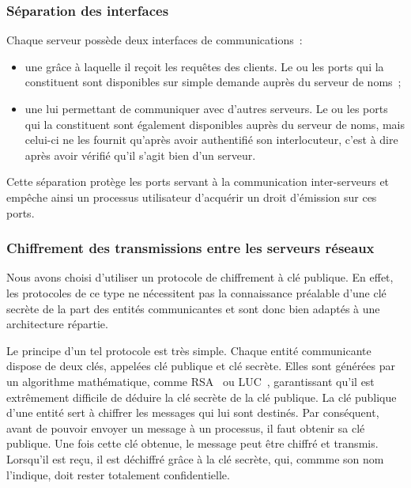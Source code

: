 \subsubsection{S\'eparation des interfaces}

Chaque serveur poss\`ede deux interfaces de communications~:
\begin{itemize}
\item une gr\^ace \`a laquelle il re\c{c}oit les requ\^etes des clients. Le ou les ports qui la constituent sont disponibles sur simple demande aupr\`es du serveur de noms~;
\item une lui permettant de communiquer avec d'autres serveurs.  Le ou les ports qui la constituent sont \'egalement disponibles aupr\`es du serveur de noms, mais celui-ci ne les fournit qu'apr\`es avoir authentifi\'e son interlocuteur, c'est \`a dire apr\`es avoir v\'erifi\'e qu'il s'agit bien d'un serveur.
\end{itemize}

Cette s\'eparation prot\`ege les ports servant \`a la communication inter-serveurs et emp\^eche ainsi un processus utilisateur d'acqu\'erir un droit d'\'emission sur ces ports.

\subsubsection{Chiffrement des transmissions entre les serveurs r\'eseaux}

Nous avons choisi d'utiliser un protocole de chiffrement \`a cl\'e publique. En effet, les protocoles de ce type ne n\'ecessitent pas la connaissance pr\'ealable d'une cl\'e secr\`ete de la part des entit\'es communicantes et sont donc
 bien adapt\'es \`a une architecture r\'epartie. 

Le principe d'un tel protocole est tr\`es simple. Chaque entit\'e communicante dispose de deux cl\'es, appel\'ees cl\'e publique et cl\'e secr\`ete. Elles sont g\'en\'er\'ees par un algorithme math\'ematique, comme RSA~\cite{Rivest78} ou LUC~\cite{Smith92}, garantissant qu'il est extr\^emement difficile de d\'eduire la cl\'e secr\`ete de la cl\'e publique.
La cl\'e publique d'une entit\'e sert \`a chiffrer les messages qui lui sont destin\'es. Par cons\'equent, avant de pouvoir envoyer un message \`a un processus, il faut obtenir sa cl\'e publique. Une fois cette cl\'e obtenue, le message peut \^etre chiffr\'e et transmis. Lorsqu'il est re\c{c}u, il est d\'echiffr\'e gr\^ace \`a la cl\'e secr\`ete, qui, commme son nom l'indique, doit rester totalement confidentielle.

